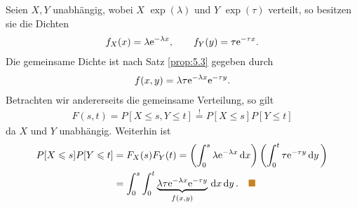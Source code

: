 \begin{bsp}
Seien $X,Y$ unabhängig, wobei $X$ $\exp(\lambda)$ und $Y$ $\exp(\tau)$
verteilt, so besitzen sie die Dichten
\begin{align*}
f_X(x) = \lambda \mathrm{e}^{-\lambda x},\qquad
f_Y(y) = \tau \mathrm{e}^{-\tau x}.
\end{align*}
Die gemeinsame Dichte ist nach Satz \ref{prop:5.3} gegeben durch
\begin{align*}
f(x,y) = \lambda\tau \mathrm{e}^{-\lambda x}\mathrm{e}^{-\tau y}.
\end{align*}
Betrachten wir andererseits die gemeinsame Verteilung, so gilt
\begin{align*}
F(s,t) = P[X\le s, Y\le t] \overset{!}{=} P[X\le s]P[Y\le t]
\end{align*}
da $X$ und $Y$ unabhängig. Weiterhin ist
\begin{align*}
P[X\le s]P[Y\le t] &= F_X(s)F_Y(t) = 
\left(\int_0^s \lambda \e^{-\lambda x}\dx\right)
\left(\int_0^t \tau \e^{-\tau y}\dy\right)\\
&= 
\int_0^s \int_0^t \underbrace{ \lambda\tau \e^{-\lambda x}\e^{-\tau
y}}_{f(x,y)}\dx\dy.\bsphere
\end{align*}
\end{bsp}

